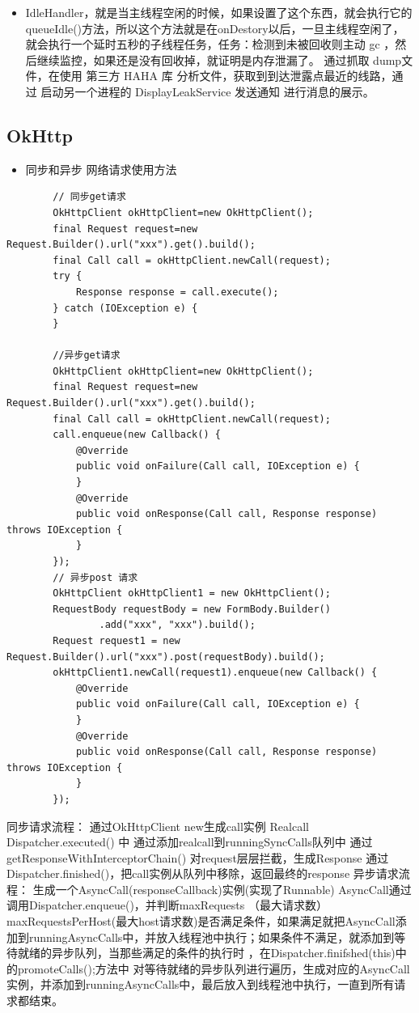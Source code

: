 \documentclass[9pt, b5paper]{article}
\begin{document}
\begin{itemize}
\item IdleHandler，就是当主线程空闲的时候，如果设置了这个东西，就会执行它的queueIdle()方法，所以这个方法就是在onDestory以后，一旦主线程空闲了，就会执行一个延时五秒的子线程任务，任务：检测到未被回收则主动 gc ，然后继续监控，如果还是没有回收掉，就证明是内存泄漏了。 通过抓取 dump文件，在使用 第三方 HAHA 库 分析文件，获取到到达泄露点最近的线路，通过 启动另一个进程的 DisplayLeakService 发送通知 进行消息的展示。
\end{itemize}
\subsection{OkHttp}
\label{sec-8-2}
\begin{itemize}
\item 同步和异步 网络请求使用方法
\end{itemize}
\begin{verbatim}
        // 同步get请求
        OkHttpClient okHttpClient=new OkHttpClient();
        final Request request=new Request.Builder().url("xxx").get().build();
        final Call call = okHttpClient.newCall(request);
        try {
            Response response = call.execute();
        } catch (IOException e) {
        }
        
        //异步get请求 
        OkHttpClient okHttpClient=new OkHttpClient();
        final Request request=new Request.Builder().url("xxx").get().build();
        final Call call = okHttpClient.newCall(request);
        call.enqueue(new Callback() {
            @Override
            public void onFailure(Call call, IOException e) {
            }
            @Override
            public void onResponse(Call call, Response response) throws IOException {
            }
        });
        // 异步post 请求
        OkHttpClient okHttpClient1 = new OkHttpClient();
        RequestBody requestBody = new FormBody.Builder()
                .add("xxx", "xxx").build();
        Request request1 = new Request.Builder().url("xxx").post(requestBody).build();
        okHttpClient1.newCall(request1).enqueue(new Callback() {
            @Override
            public void onFailure(Call call, IOException e) {
            }
            @Override
            public void onResponse(Call call, Response response) throws IOException {
            }
        });
\end{verbatim}
同步请求流程：
通过OkHttpClient new生成call实例 Realcall
Dispatcher.executed() 中 通过添加realcall到runningSyncCalls队列中
通过 getResponseWithInterceptorChain() 对request层层拦截，生成Response
通过Dispatcher.finished()，把call实例从队列中移除，返回最终的response
异步请求流程：
生成一个AsyncCall(responseCallback)实例(实现了Runnable)
AsyncCall通过调用Dispatcher.enqueue()，并判断maxRequests （最大请求数）maxRequestsPerHost(最大host请求数)是否满足条件，如果满足就把AsyncCall添加到runningAsyncCalls中，并放入线程池中执行；如果条件不满足，就添加到等待就绪的异步队列，当那些满足的条件的执行时 ，在Dispatcher.finifshed(this)中的promoteCalls();方法中 对等待就绪的异步队列进行遍历，生成对应的AsyncCall实例，并添加到runningAsyncCalls中，最后放入到线程池中执行，一直到所有请求都结束。
\end{document}
